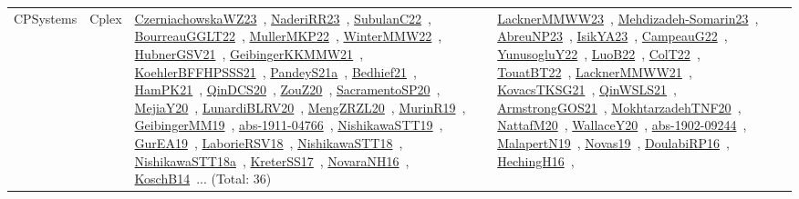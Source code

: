 {\begin{longtable}{lp{3cm}>{\raggedright\arraybackslash}p{6cm}>{\raggedright\arraybackslash}p{6cm}>{\raggedright\arraybackslash}p{8cm}}
CPSystems & Cplex & \href{works/CzerniachowskaWZ23.pdf}{CzerniachowskaWZ23}~\cite{CzerniachowskaWZ23}, \href{works/NaderiRR23.pdf}{NaderiRR23}~\cite{NaderiRR23}, \href{works/SubulanC22.pdf}{SubulanC22}~\cite{SubulanC22}, \href{works/BourreauGGLT22.pdf}{BourreauGGLT22}~\cite{BourreauGGLT22}, \href{works/MullerMKP22.pdf}{MullerMKP22}~\cite{MullerMKP22}, \href{works/WinterMMW22.pdf}{WinterMMW22}~\cite{WinterMMW22}, \href{works/HubnerGSV21.pdf}{HubnerGSV21}~\cite{HubnerGSV21}, \href{works/GeibingerKKMMW21.pdf}{GeibingerKKMMW21}~\cite{GeibingerKKMMW21}, \href{works/KoehlerBFFHPSSS21.pdf}{KoehlerBFFHPSSS21}~\cite{KoehlerBFFHPSSS21}, \href{works/PandeyS21a.pdf}{PandeyS21a}~\cite{PandeyS21a}, \href{works/Bedhief21.pdf}{Bedhief21}~\cite{Bedhief21}, \href{works/HamPK21.pdf}{HamPK21}~\cite{HamPK21}, \href{works/QinDCS20.pdf}{QinDCS20}~\cite{QinDCS20}, \href{works/ZouZ20.pdf}{ZouZ20}~\cite{ZouZ20}, \href{works/SacramentoSP20.pdf}{SacramentoSP20}~\cite{SacramentoSP20}, \href{works/MejiaY20.pdf}{MejiaY20}~\cite{MejiaY20}, \href{works/LunardiBLRV20.pdf}{LunardiBLRV20}~\cite{LunardiBLRV20}, \href{works/MengZRZL20.pdf}{MengZRZL20}~\cite{MengZRZL20}, \href{works/MurinR19.pdf}{MurinR19}~\cite{MurinR19}, \href{works/GeibingerMM19.pdf}{GeibingerMM19}~\cite{GeibingerMM19}, \href{works/abs-1911-04766.pdf}{abs-1911-04766}~\cite{abs-1911-04766}, \href{works/NishikawaSTT19.pdf}{NishikawaSTT19}~\cite{NishikawaSTT19}, \href{works/GurEA19.pdf}{GurEA19}~\cite{GurEA19}, \href{works/LaborieRSV18.pdf}{LaborieRSV18}~\cite{LaborieRSV18}, \href{works/NishikawaSTT18.pdf}{NishikawaSTT18}~\cite{NishikawaSTT18}, \href{works/NishikawaSTT18a.pdf}{NishikawaSTT18a}~\cite{NishikawaSTT18a}, \href{works/KreterSS17.pdf}{KreterSS17}~\cite{KreterSS17}, \href{works/NovaraNH16.pdf}{NovaraNH16}~\cite{NovaraNH16}, \href{works/KoschB14.pdf}{KoschB14}~\cite{KoschB14}... (Total: 36) & \href{works/LacknerMMWW23.pdf}{LacknerMMWW23}~\cite{LacknerMMWW23}, \href{works/Mehdizadeh-Somarin23.pdf}{Mehdizadeh-Somarin23}~\cite{Mehdizadeh-Somarin23}, \href{works/AbreuNP23.pdf}{AbreuNP23}~\cite{AbreuNP23}, \href{works/IsikYA23.pdf}{IsikYA23}~\cite{IsikYA23}, \href{works/CampeauG22.pdf}{CampeauG22}~\cite{CampeauG22}, \href{works/YunusogluY22.pdf}{YunusogluY22}~\cite{YunusogluY22}, \href{works/LuoB22.pdf}{LuoB22}~\cite{LuoB22}, \href{works/ColT22.pdf}{ColT22}~\cite{ColT22}, \href{works/TouatBT22.pdf}{TouatBT22}~\cite{TouatBT22}, \href{works/LacknerMMWW21.pdf}{LacknerMMWW21}~\cite{LacknerMMWW21}, \href{works/KovacsTKSG21.pdf}{KovacsTKSG21}~\cite{KovacsTKSG21}, \href{works/QinWSLS21.pdf}{QinWSLS21}~\cite{QinWSLS21}, \href{works/ArmstrongGOS21.pdf}{ArmstrongGOS21}~\cite{ArmstrongGOS21}, \href{works/MokhtarzadehTNF20.pdf}{MokhtarzadehTNF20}~\cite{MokhtarzadehTNF20}, \href{works/NattafM20.pdf}{NattafM20}~\cite{NattafM20}, \href{works/WallaceY20.pdf}{WallaceY20}~\cite{WallaceY20}, \href{works/abs-1902-09244.pdf}{abs-1902-09244}~\cite{abs-1902-09244}, \href{works/MalapertN19.pdf}{MalapertN19}~\cite{MalapertN19}, \href{works/Novas19.pdf}{Novas19}~\cite{Novas19}, \href{works/DoulabiRP16.pdf}{DoulabiRP16}~\cite{DoulabiRP16}, \href{works/HechingH16.pdf}{HechingH16}~\cite{HechingH16}, 
\end{longtable}}

